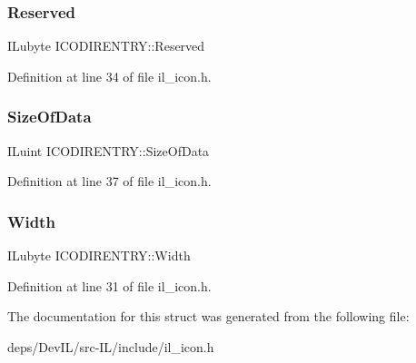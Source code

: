 \subsubsection{\texorpdfstring{Reserved}{Reserved}}
{\footnotesize\ttfamily I\+Lubyte I\+C\+O\+D\+I\+R\+E\+N\+T\+R\+Y\+::\+Reserved}



Definition at line 34 of file il\+\_\+icon.\+h.

\mbox{\label{structICODIRENTRY_ae84ee221bf1b8ff277a803b7b127d3bb}} 
\subsubsection{\texorpdfstring{Size\+Of\+Data}{SizeOfData}}
{\footnotesize\ttfamily I\+Luint I\+C\+O\+D\+I\+R\+E\+N\+T\+R\+Y\+::\+Size\+Of\+Data}



Definition at line 37 of file il\+\_\+icon.\+h.

\mbox{\label{structICODIRENTRY_a4dd77ac4632069ff8a7d032f0adc5bfa}} 
\subsubsection{\texorpdfstring{Width}{Width}}
{\footnotesize\ttfamily I\+Lubyte I\+C\+O\+D\+I\+R\+E\+N\+T\+R\+Y\+::\+Width}



Definition at line 31 of file il\+\_\+icon.\+h.



The documentation for this struct was generated from the following file\+:\begin{DoxyCompactItemize}
\item 
deps/\+Dev\+I\+L/src-\/\+I\+L/include/il\+\_\+icon.\+h\end{DoxyCompactItemize}
